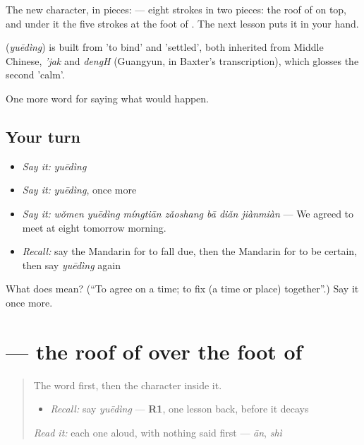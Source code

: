 The new character, in pieces:  — eight strokes in two pieces: the roof of  on top, and under it the five strokes at the foot of . The next lesson puts it in your hand.

\begin{cousinweb}
\textbf{} (\emph{yuēdìng}) is built from  'to bind' and  'settled', both inherited from Middle Chinese, \emph{'jak} and \emph{dengH} (Guangyun, in Baxter's transcription), which glosses the second 'calm'.
\end{cousinweb}

\begin{grammarlens}[title={What you've built}]
One more word for saying what would happen.
\end{grammarlens}

\subsection*{Your turn}
\begin{itemize}
\raggedright
  \item \emph{Say it:} \emph{yuēdìng}
  \item \emph{Say it:} \emph{yuēdìng}, once more
  \item \emph{Say it:} \emph{wǒmen yuēdìng míngtiān zǎoshang bā diǎn jiànmiàn} — We agreed to meet at eight tomorrow morning.
  \item \emph{Recall:} say the Mandarin for to fall due, then the Mandarin for to be certain, then say \emph{yuēdìng} again
\end{itemize}

\begin{tcolorbox}[breakable,colback=teal!4,colframe=teal!35!black,title={Before you move on}]
What does  mean? (\textquotedblleft{}To agree on a time; to fix (a time or place) together\textquotedblright{}.) Say it once more.
\end{tcolorbox}
\section[\texorpdfstring{\zh{定} (dìng)}{定 (dìng)}]{ — the roof of  over the foot of }

\label{lesson:ZH-W390-ding-settle}



\begin{quote}
The word first, then the character inside it.

\begin{itemize}
\raggedright
  \item \emph{Recall:} say \emph{yuēdìng} — \textbf{R1}, one lesson back, before it decays
\end{itemize}

\begin{quote}
 
\end{quote}

\emph{Read it:} each one aloud, with nothing said first — \emph{ān}, \emph{shì}
\end{quote}

